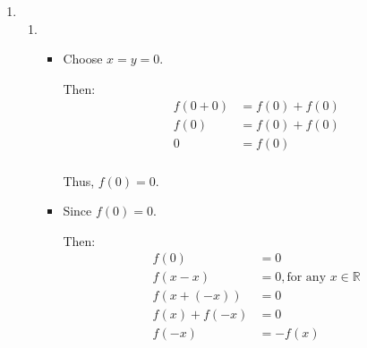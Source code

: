 \documentclass[12pt,letterpaper]{article}
\begin{document}
\begin{enumerate}[label=Exercise 4.3.\arabic*]
\begin{enumerate}
          If we had $|f(x) - f(y)| \leq c|x - y| < \epsilon$ for any $\epsilon > 0$,
          we'd be all set.

          \begin{proof}
            Let $y$ be a limit point of $\mathbb{R}$.

            For any $\epsilon > 0$, choose $\delta = \frac{\epsilon}{c}$.

            Then we have $0 < |x - y| < \delta = \frac{\epsilon}{c} \implies |f(x) - f(y)| \leq c|x - y|$.

            Since $|x - y| < \frac{\epsilon}{c} \implies |f(x) - f(y)| \leq c|x - y| < c\frac{\epsilon}{c} = \epsilon$.

            So $f$ is continuous at $y$.
            But our choice of $y$ was arbitrary, so $f$ is continuous on all of $\mathbb{R}$.
          \end{proof}
        \item
        \item
        \item
      \end{enumerate}
    \item
      \begin{enumerate}
        \item
          \begin{itemize}
            \item
              Choose $x = y = 0$.

              Then:
              \begin{align*}
                f(0 + 0) &= f(0) + f(0) \\
                f(0) &= f(0) + f(0) \\
                0 &= f(0) \\
              \end{align*}

              Thus, $f(0) = 0$.
            \item
              Since $f(0) = 0$.

              Then:
              \begin{align*}
                f(0) &= 0 \\
                f(x - x) &= 0, \text{for any } x \in \mathbb{R} \\
                f(x + (- x)) &= 0 \\
                f(x) + f(- x) &= 0 \\
                f(- x) &= -f(x) \\
              \end{align*}


\end{itemize}
\end{enumerate}
\end{enumerate}
\end{document}
